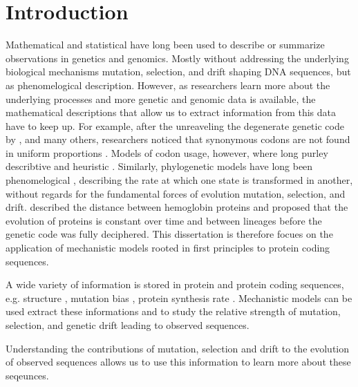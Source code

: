 \chapter{Introduction} 
\label{ch:introduction}

Mathematical and statistical have long been used to describe or summarize observations in genetics and genomics.
Mostly without addressing the underlying biological mechanisms mutation, selection, and drift shaping DNA sequences, but as phenomelogical description.
However, as researchers learn more about the underlying processes and more genetic and genomic data is available, the mathematical descriptions that allow us to extract information from this data have to keep up.
For example, after the unreaveling the degenerate genetic code by \citet{MatthaeiAndNirenberg1961,NirenbergAndMatthaei1961,Maxwell1962,LederAndNirenberg1964}, and many others, researchers noticed that synonymous codons are not found in uniform proportions \citep{fitch1976,grantham1980,ikemura1981,grantham1981,sharp1988}.
Models of codon usage, however, where long purley describtive and heuristic \citep{ikemura1981,BennetzenAndHall1982,sharp1987,wright1990}.
Similarly, phylogenetic models have long been phenomelogical \citep{JukesAndCantor1969,Dayhoff1978,Kimura1980,felsenstein1981,Altschul1991}, describing the rate at which one state is transformed in another, without regards for the fundamental forces of evolution mutation, selection, and drift.
\citet{ZuckerkandlAndPauling1962} described the distance between hemoglobin proteins and proposed that the evolution of proteins is constant over time and between lineages before the genetic code was fully deciphered.
This dissertation is therefore focues on the application of mechanistic models rooted in first principles to protein coding sequences.

A wide variety of information is stored in protein and protein coding sequences, e.g. structure \citep{anfinsen1973}, mutation bias \citep{ShahAndGilchrist2011, gilchrist2015}, protein synthesis rate \citep{gilchrist2007}. 
Mechanistic models can be used extract these informations and to study the relative strength of mutation, selection, and genetic drift leading to observed sequences.

Understanding the contributions of mutation, selection and drift to the evolution of observed sequences allows us to use this information to learn more about these seqeunces.




